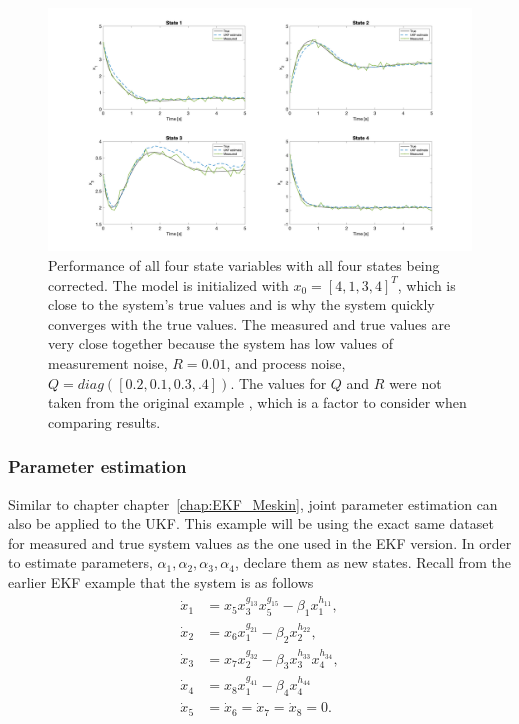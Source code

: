 \begin{figure}[ht]
    \centering
    \includegraphics[scale = 0.25]{UKF_states.png}
    \caption{Performance of all four state variables with all four states being corrected. The model is initialized with $x_0 = [4, 1, 3, 4]^T$, which is close to the system's true values and is why the system quickly converges with the true values. The measured and true values are very close together because the system has low values of measurement noise, $R=0.01$, and process noise, $Q=diag([0.2, 0.1, 0.3, .4])$. The values for $Q$ and $R$ were not taken from the original example \cite{article5}, which is a factor to consider when comparing results.}
    \label{fig:UKF_states}
\end{figure}




\clearpage


\subsubsection{Parameter estimation}

Similar to chapter chapter~\ref{chap:EKF_Meskin}, joint parameter estimation can also be applied to the UKF. This example will be using the exact same dataset for measured and true system values as the one used in the EKF version. In order to estimate parameters, $\alpha_1,\alpha_2, \alpha_3, \alpha_4$, declare them as new states. Recall from the earlier EKF example that the system is as follows
\begin{align*}
\dot x_1 &= x_5  x_3^{g_{13}} x_5^{g_{15}} - \beta_1 x_1^{h_{11}} , \\
\dot x_2 &= x_6  x_1^{g_{21}} - \beta_2 x_2^{h_{22}}, \\
\dot x_3 &= x_7  x_2^{g_{32}} - \beta_3 x_3^{h_{33}} x_4^{h_{34}}, \\
\dot x_4 &= x_8   x_1^{g_{41}} - \beta_4 x_4^{h_{44}} \\
\dot x_5 &= \dot x_6= \dot x_7 = \dot x_8 = 0.
\end{align*}

